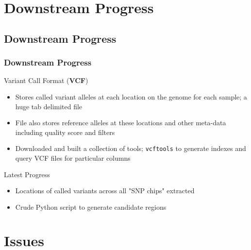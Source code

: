 \documentclass{beamer}
\begin{document}
\section{Downstream Progress}
\subsection{Downstream Progress}

\begin{frame}[t]
\frametitle{Downstream Progress}
    \begin{beamerboxesrounded}[shadow=true]{}
        \begin{center}
            Variant Call Format (\textbf{VCF})
        \end{center}
    \end{beamerboxesrounded}
    \begin{itemize}
        \item Stores called variant alleles at each location on the genome for 
            each sample; a huge tab delimited file
        \item File also stores reference alleles at these locations and other
            meta-data including quality score and filters
        \item Downloaded and built a collection of tools; \texttt{vcftools} to
            generate indexes and query VCF files for particular columns
    \end{itemize}

    \vskip 0.5cm

    \begin{beamerboxesrounded}[shadow=true]{}
        \begin{center}
            Latest Progress
        \end{center}
    \end{beamerboxesrounded}
    \begin{itemize}
        \item Locations of called variants across all "SNP chips" extracted
        \item Crude Python script to generate candidate regions
    \end{itemize}
\end{frame}


\section{Issues}
\end{document}
